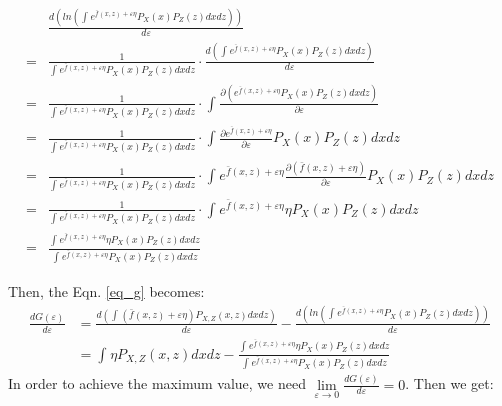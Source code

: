 \documentclass[UTF8]{article}
\newcommand{\refequ}[1]{Eqn. \ref{#1}}
\begin{document}
\begin{equation}
    \begin{split}
            & \frac{ d \left( ln(\int_{}^{}e^{\bar{f}(x,z)+\varepsilon \eta}P_X(x)P_Z(z)dxdz) \right)}{d \varepsilon} \\ 
        = & \frac{1}{\int_{}^{}e^{\bar{f}(x,z)+\varepsilon \eta}P_X(x)P_Z(z)dxdz} \cdot  \frac{ d \left( \int_{}^{}e^{\bar{f}(x,z)+\varepsilon \eta}P_X(x)P_Z(z)dxdz \right)}{d \varepsilon} \\ 
        = & \frac{1}{\int_{}^{}e^{\bar{f}(x,z)+\varepsilon \eta}P_X(x)P_Z(z)dxdz} \cdot  \int_{}^{} \frac{ \partial \left( e^{\bar{f}(x,z)+\varepsilon \eta}P_X(x)P_Z(z)dxdz \right) }{\partial \varepsilon} \\ 
        = & \frac{1}{\int_{}^{}e^{\bar{f}(x,z)+\varepsilon \eta}P_X(x)P_Z(z)dxdz} \cdot  \int_{}^{} \frac{ \partial  e^{\bar{f}(x,z)+\varepsilon \eta}   }{\partial \varepsilon}P_X(x)P_Z(z)dxdz \\ 
        = & \frac{1}{\int_{}^{}e^{\bar{f}(x,z)+\varepsilon \eta}P_X(x)P_Z(z)dxdz} \cdot  \int_{}^{} e^{\bar{f}(x,z)+\varepsilon \eta} \frac{ \partial  (\bar{f}(x,z)+\varepsilon \eta)   }{\partial \varepsilon}P_X(x)P_Z(z)dxdz \\ 
        = & \frac{1}{\int_{}^{}e^{\bar{f}(x,z)+\varepsilon \eta}P_X(x)P_Z(z)dxdz} \cdot  \int_{}^{} e^{\bar{f}(x,z)+\varepsilon \eta} \eta P_X(x)P_Z(z)dxdz \\
        = & \frac{\int_{}^{} e^{\bar{f}(x,z)+\varepsilon \eta} \eta P_X(x)P_Z(z)dxdz}{\int_{}^{}e^{\bar{f}(x,z)+\varepsilon \eta}P_X(x)P_Z(z)dxdz}
    \end{split}
\end{equation}

Then, the \refequ{eq_g} becomes:
\begin{equation}
    \begin{split}
        \frac{d G(\varepsilon)}{d \varepsilon} & = \frac{d \left( \int_{}^{} ( \bar{f}(x,z)+\varepsilon \eta ) P_{X,Z}(x,z)dxdz \right) }{d \varepsilon} -  \frac{ d \left( ln(\int_{}^{}e^{\bar{f}(x,z)+\varepsilon \eta}P_X(x)P_Z(z)dxdz) \right)}{d \varepsilon} \\
        & = \int_{}^{}    \eta  P_{X,Z}(x,z)dxdz  -  \frac{\int_{}^{} e^{\bar{f}(x,z)+\varepsilon \eta} \eta P_X(x)P_Z(z)dxdz}{\int_{}^{}e^{\bar{f}(x,z)+\varepsilon \eta}P_X(x)P_Z(z)dxdz}
    \end{split}
\end{equation}
In order to achieve the maximum value, we need $ \lim \limits_{\varepsilon \to 0} \frac{dG(\varepsilon)}{d \varepsilon} = 0  $. Then we get:
\end{document}
